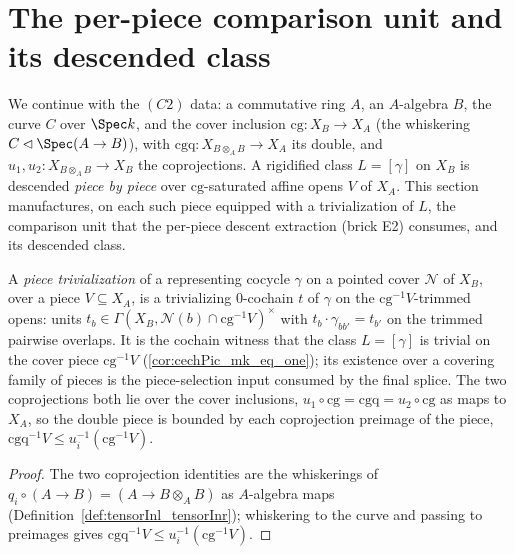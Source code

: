 \section{The per-piece comparison unit and its descended class}
\label{sec:effectivityComparisonUnit}

We continue with the \((C2)\) data: a commutative ring \(A\), an \(A\)-algebra \(B\), the curve
\(C\) over \(\Spec k\), and the cover inclusion \(\mathrm{cg} \colon X_B \to X_A\) (the whiskering
\(C \lhd \Spec(A \to B)\)), with \(\mathrm{cgq} \colon X_{B \otimes_A B} \to X_A\) its double, and
\(u_1, u_2 \colon X_{B \otimes_A B} \to X_B\) the coprojections. A rigidified class \(L =
[\gamma]\) on \(X_B\) is descended \emph{piece by piece} over \(\mathrm{cg}\)-saturated affine opens
\(V\) of \(X_A\). This section manufactures, on each such piece equipped with a trivialization of
\(L\), the comparison unit that the per-piece descent extraction (brick E2) consumes, and its
descended class.

\begin{definition}
  \label{def:pieceTrivialization}
  \leanok
  A \emph{piece trivialization} of a representing cocycle \(\gamma\) on a pointed cover \(\mathcal N\)
  of \(X_B\), over a piece \(V \subseteq X_A\), is a trivializing \(0\)-cochain \(t\) of \(\gamma\)
  on the \(\mathrm{cg}^{-1}V\)-trimmed opens: units \(t_b \in \Gamma(X_B, \mathcal N(b) \cap
  \mathrm{cg}^{-1}V)^{\times}\) with \(t_b \cdot \gamma_{b b'} = t_{b'}\) on the trimmed pairwise
  overlaps. It is the cochain witness that the class \(L = [\gamma]\) is trivial on the cover piece
  \(\mathrm{cg}^{-1}V\) (\ref{cor:cechPic_mk_eq_one}); its existence over a covering family of pieces
  is the piece-selection input consumed by the final splice. The two coprojections both lie over the
  cover inclusions, \(u_1 \circ \mathrm{cg} = \mathrm{cgq} = u_2 \circ \mathrm{cg}\) as maps to
  \(X_A\), so the double piece is bounded by each coprojection preimage of the piece,
  \(\mathrm{cgq}^{-1}V \le u_i^{-1}(\mathrm{cg}^{-1}V)\).
\end{definition}
\begin{proof}
  \leanok
  The two coprojection identities are the whiskerings of \(q_i \circ (A \to B) = (A \to B \otimes_A
  B)\) as \(A\)-algebra maps (Definition~\ref{def:tensorInl_tensorInr}); whiskering to the curve and
  passing to preimages gives \(\mathrm{cgq}^{-1}V \le u_i^{-1}(\mathrm{cg}^{-1}V)\).
\end{proof}


